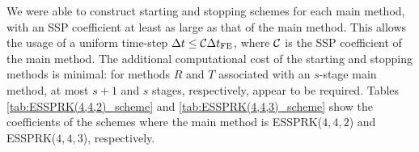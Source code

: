 We were able to construct starting and stopping schemes for each main 
method, with an SSP coefficient at least as large as that of the main method.
This allows the usage of a uniform time-step $\Delta t \leq \mathcal{C}\Delta t_{\textnormal{FE}}$, 
where $\mathcal{C}$ is the SSP coefficient of the main method.
The additional computational cost
of the starting and stopping methods is minimal:
for methods $R$ and $T$ associated with an $s$-stage main method,
at most $s + 1$ and $s$ stages, respectively, appear to be required.
Tables \ref{tab:ESSPRK(4,4,2)_scheme} and \ref{tab:ESSPRK(4,4,3)_scheme} 
show the coefficients of the schemes where the main 
method is ESSPRK($4,4,2$) and ESSPRK($4,4,3$), respectively. 

